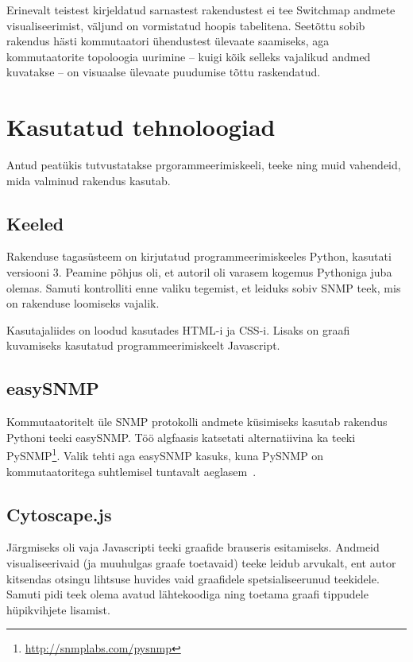 \documentclass[12pt]{article}
\begin{document}
Erinevalt teistest kirjeldatud sarnastest rakendustest ei tee Switchmap andmete visualiseerimist,
väljund on vormistatud hoopis tabelitena.
Seetõttu sobib rakendus hästi kommutaatori ühendustest ülevaate saamiseks, aga kommutaatorite
topoloogia uurimine -- kuigi kõik selleks vajalikud andmed kuvatakse --  on visuaalse ülevaate
puudumise tõttu raskendatud.

\newpage
\section{Kasutatud tehnoloogiad} \label{usedTech}
Antud peatükis tutvustatakse prgorammeerimiskeeli, teeke ning muid vahendeid, mida valminud
rakendus kasutab.

\subsection{Keeled}
Rakenduse tagasüsteem on kirjutatud programmeerimiskeeles Python, kasutati versiooni 3.
Peamine põhjus oli, et autoril oli varasem kogemus Pythoniga juba olemas.
Samuti kontrolliti enne valiku tegemist, et leiduks sobiv SNMP teek, mis on rakenduse loomiseks
vajalik.

Kasutajaliides on loodud kasutades HTML-i ja CSS-i.
Lisaks on graafi kuvamiseks kasutatud programmeerimiskeelt Javascript.

\subsection{easySNMP} \label{easySNMP}
Kommutaatoritelt üle SNMP protokolli andmete küsimiseks kasutab rakendus Pythoni teeki easySNMP\@.
Töö algfaasis katsetati alternatiivina ka teeki PySNMP\footnote{\url{http://snmplabs.com/pysnmp}}.
Valik tehti aga easySNMP kasuks, kuna PySNMP on kommutaatoritega suhtlemisel tuntavalt aeglasem~\cite{EasySNMPDocs}.

\subsection{Cytoscape.js} \label{subsec:cyto}

Järgmiseks oli vaja Javascripti teeki graafide brauseris esitamiseks.
Andmeid visualiseerivaid (ja muuhulgas graafe toetavaid) teeke leidub arvukalt, ent autor kitsendas
otsingu lihtsuse huvides vaid graafidele spetsialiseerunud teekidele.
Samuti pidi teek olema avatud lähtekoodiga ning toetama graafi tippudele hüpikvihjete lisamist.
\end{document}
